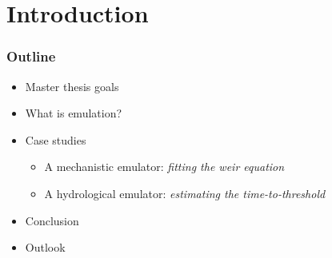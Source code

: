 \documentclass[xcolor=dvipsnames, USenglish]{beamer}  %
\begin{document}
\section{Introduction}

  \begin{frame}
    \frametitle{Outline}
    \begin{itemize}
      \item Master thesis goals
      \item What is emulation?
      \item Case studies
      \begin{itemize}
        \item A mechanistic emulator: \emph{fitting the weir equation}
        \item A hydrological emulator: \emph{estimating the time-to-threshold}
      \end{itemize}
      \item Conclusion
      \item Outlook
     \end{itemize}
  \end{frame}
\end{document}
